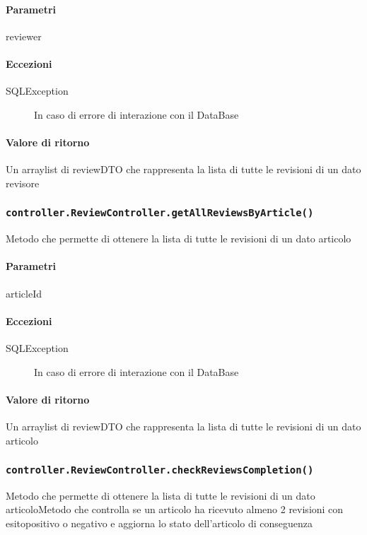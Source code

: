 \paragraph{Parametri}
\begin{description}
\item reviewer
\end{description}
\paragraph{Eccezioni}
\begin{description}
\item[SQLException] In caso di errore di interazione con il DataBase
\end{description}
\paragraph{Valore di ritorno}
Un arraylist di reviewDTO che rappresenta la lista di tutte le revisioni di un dato revisore


\subsubsection{\texttt{controller.ReviewController.getAllReviewsByArticle()}}
Metodo che permette di ottenere la lista di tutte le revisioni di un dato articolo
\paragraph{Parametri}
\begin{description}
\item articleId
\end{description}
\paragraph{Eccezioni}
\begin{description}
\item[SQLException] In caso di errore di interazione con il DataBase
\end{description}
\paragraph{Valore di ritorno}
Un arraylist di reviewDTO che rappresenta la lista di tutte le revisioni di un dato articolo

\subsubsection{\texttt{controller.ReviewController.checkReviewsCompletion()}}
Metodo che permette di ottenere la lista di tutte le revisioni di un dato articoloMetodo che controlla se un articolo ha ricevuto almeno 2 revisioni con esitopositivo o negativo e aggiorna lo stato dell'articolo di conseguenza
